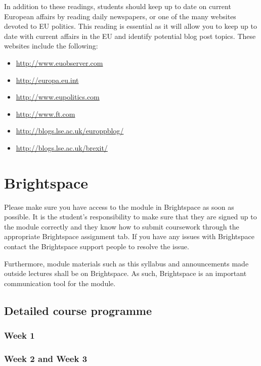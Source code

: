 In addition to these readings, students should keep up to date on current European affairs by reading daily newspapers, or one of the many websites devoted to EU politics. This reading is essential as it will allow you to keep up to date with current affairs in the EU and identify potential blog post topics. These websites include the following:

\begin{itemize}
	\item \url{http://www.euobserver.com}
	\item \url{http://europa.eu.int}
	\item \url{http://www.eupolitics.com}
	\item \url{http://www.ft.com}
	\item \url{http://blogs.lse.ac.uk/europpblog/}
	\item \url{http://blogs.lse.ac.uk/brexit/}
\end{itemize}

\section*{Brightspace}

Please make sure you have access to the module in Brightspace as soon as possible. It is the student's responsibility to make sure that they are signed up to the module correctly and they know how to submit coursework through the appropriate Brightspace assignment tab. If you have any issues with Brightspace contact the Brightspace support people to resolve the issue.

Furthermore, module materials such as this syllabus and announcements made outside lectures shall be on Brightspace. As such, Brightspace is an important communication tool for the module.

\subsection*{Detailed course programme}

\subsubsection*{Week 1}



\subsubsection*{Week 2 and Week 3}

